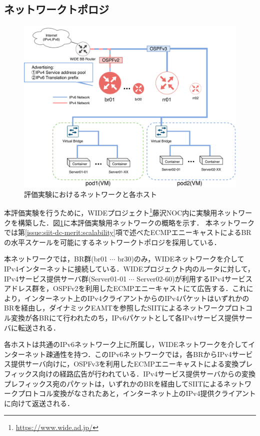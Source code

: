 \subsection{ネットワークトポロジ}
\begin{figure}[H]
    \begin{center}
    \includegraphics[width=15cm,pagebox=cropbox,clip]{img/evaluation_experiment_no_injector.pdf}
    \end{center}
    \caption{評価実験におけるネットワークと各ホスト}
    \label{fig:evaluation_experiment}
\end{figure}

本評価実験を行うために，WIDEプロジェクト\footnote{\url{https://www.wide.ad.jp/}}藤沢NOC内に実験用ネットワークを構築した．図\ref{fig:evaluation_experiment}に本評価実験用ネットワークの概略を示す．
本ネットワークでは第\ref{issue:siit-dc-merit:scalability}項で述べたECMPエニーキャストによるBRの水平スケールを可能にするネットワークトポロジを採用している．


本ネットワークでは，BR群(br01 $\cdots$ br30)のみ，WIDEネットワークを介してIPv4インターネットに接続している．WIDEプロジェクト内のルータに対して，IPv4サービス提供サーバ群(Server01-01  $\cdots$ Server02-60)が利用するIPv4サービスアドレス群を，OSPFv2\cite{RFC2328}を利用したECMPエニーキャストにて広告する．これにより，インターネット上のIPv4クライアントからのIPv4パケットはいずれかのBRを経由し，ダイナミックEAMTを参照したSIITによるネットワークプロトコル変換が各BRにて行われたのち，IPv6パケットとして各IPv4サービス提供サーバに転送される．

各ホストは共通のIPv6ネットワーク上に所属し，WIDEネットワークを介してインターネット疎通性を持つ．このIPv6ネットワークでは，各BRからIPv4サービス提供サーバ向けに，OSPFv3\cite{RFC5340}を利用したECMPエニーキャストによる変換プレフィックス向けの経路広告が行われている．IPv4サービス提供サーバからの変換プレフィックス宛のパケットは，いずれかのBRを経由してSIITによるネットワークプロトコル変換がなされたあと，インターネット上のIPv4提供クライアントに向けて返送される．


